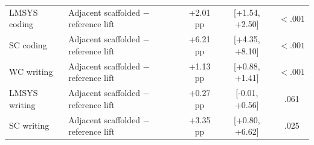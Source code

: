 \begin{table}[p]
{\begin{tabular}{llccc}
LMSYS coding & Adjacent scaffolded $-$ reference lift & +2.01 pp & [+1.54, +2.50] & $<.001$ \\
SC coding & Adjacent scaffolded $-$ reference lift & +6.21 pp & [+4.35, +8.10] & $<.001$ \\
WC writing & Adjacent scaffolded $-$ reference lift & +1.13 pp & [+0.88, +1.41] & $<.001$ \\
LMSYS writing & Adjacent scaffolded $-$ reference lift & +0.27 pp & [-0.01, +0.56] & .061 \\
SC writing & Adjacent scaffolded $-$ reference lift & +3.35 pp & [+0.80, +6.62] & .025 \\
\bottomrule
\end{tabular}%
}
\end{table}
